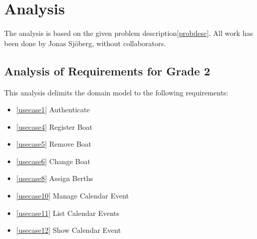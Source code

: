 %
%
%


\section{Analysis}
The analysis is based on the given problem description\ref{probdesc}.
All work has been done by Jonas Sjöberg, without collaborators.


\subsection{Analysis of Requirements for Grade 2}
This analysis delimits the domain model to the following requirements:

\begin{itemize}
  \item \ref{usecase1} Authenticate
  \item \ref{usecase4} Register Boat
  \item \ref{usecase5} Remove Boat
  \item \ref{usecase6} Change Boat
  \item \ref{usecase8} Assign Berths
  \item \ref{usecase10} Manage Calendar Event
  \item \ref{usecase11} List Calendar Events
  \item \ref{usecase12} Show Calendar Event
\end{itemize}


